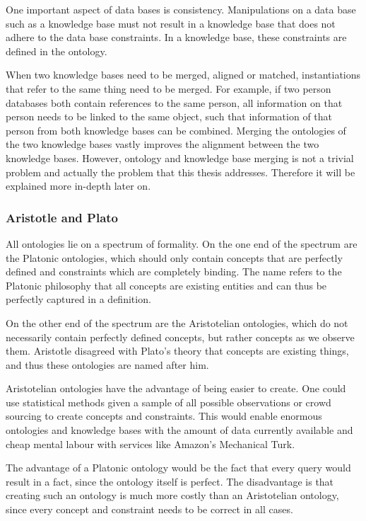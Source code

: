 \documentclass{article}
\begin{document}
 One important aspect of data bases is consistency. Manipulations on a data base such as a knowledge base must not result in a knowledge base that does not adhere to the data base constraints. In a knowledge base, these constraints are defined in the ontology.
 
 When two knowledge bases need to be merged, aligned or matched, instantiations that refer to the same thing need to be merged. For example, if two person databases both contain references to the same person, all information on that person needs to be linked to the same object, such that information of that person from both knowledge bases can be combined. Merging the ontologies of the two knowledge bases vastly improves the alignment between the two knowledge bases. However, ontology and knowledge base merging is not a trivial problem and actually the problem that this thesis addresses. Therefore it will be explained more in-depth later on\cite{09ontology}.
 \subsubsection{Aristotle and Plato}
 All ontologies lie on a spectrum of formality. On the one end of the spectrum are the Platonic ontologies, which should only contain concepts that are perfectly defined and constraints which are completely binding. The name refers to the Platonic philosophy that all concepts are existing entities and can thus be perfectly captured in a definition.
 
 On the other end of the spectrum are the Aristotelian ontologies, which do not necessarily contain perfectly defined concepts, but rather concepts as we observe them. Aristotle disagreed with Plato's theory that concepts are existing things, and thus these ontologies are named after him\cite{aristotleplato}.
 
 Aristotelian ontologies have the advantage of being easier to create. One could use statistical methods given a sample of all possible observations or crowd sourcing to create concepts and constraints. This would enable enormous ontologies and knowledge bases with the amount of data currently available and cheap mental labour with services like Amazon's Mechanical Turk.
 
 The advantage of a Platonic ontology would be the fact that every query would result in a fact, since the ontology itself is perfect. The disadvantage is that creating such an ontology is much more costly than an Aristotelian ontology, since every concept and constraint needs to be correct in all cases.
 
\end{document}

